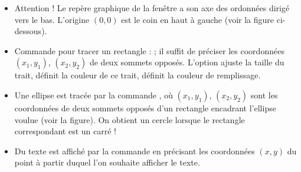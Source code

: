 \documentclass[11pt,class=report,crop=false]{standalone}
\begin{document}
\begin{cours}
\begin{itemize}
    
  \item Attention ! Le repère graphique de la fenêtre a son axe des ordonnées dirigé vers le bas. L'origine $(0,0)$ est le coin en haut à gauche (voir la figure ci-dessous). 
  
  \item Commande pour tracer un rectangle :  ; il suffit de préciser les coordonnées $(x_1,y_1)$, $(x_2,y_2)$ de deux sommets opposés. L'option  ajuste la taille du trait,  définit la couleur de ce trait,  définit la couleur de remplissage.
  
  \item Une ellipse est tracée par la commande , où $(x_1,y_1)$, $(x_2,y_2)$ sont les coordonnées de deux sommets opposés d'un rectangle encadrant l'ellipse voulue (voir la figure). On obtient un cercle lorsque le rectangle correspondant est un carré !  
  
  \item Du texte est affiché par la commande  en précisant les coordonnées $(x,y)$ du point à partir duquel l'on souhaite afficher le texte. 
  
\end{itemize}


\end{cours}


\end{document}
